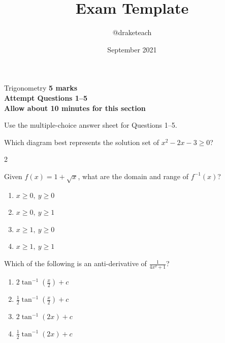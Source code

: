 \documentclass[12pt]{extarticle}    %
\title{Exam Template}       %
\author{@draketeach}        %
\date{September 2021}       %
\begin{document}

\begin{sectionheader}{Trigonometry}
    \textbf{5 marks\\
    Attempt Questions 1--5\\
    Allow about 10 minutes for this section}
    
    Use the multiple-choice answer sheet for Questions 1--5.
\end{sectionheader}

\begin{multiplechoice}              %

    \item Which diagram best represents the solution set of $x^2-2x-3\ge 0$?                %
    \begin{enumerate}               %
    \begin{multicols}{2}            %
        \item {}    %
        \item {}
        \item {}
        \item {}
    \end{multicols}
    \end{enumerate}

    \item Given $f(x)=1+\sqrt{x}$, what are the domain and range of $f^{-1}(x)$?    %
    \begin{enumerate}               %
        \item $x\ge 0,\ y\ge 0$     %
        \item $x\ge 0,\ y\ge 1$
        \item $x\ge 1,\ y\ge 0$
        \item $x\ge 1,\ y\ge 1$
    \end{enumerate}    

    \item Which of the following is an anti-derivative of $\displaystyle\frac{1}{4x^2+1}$?
    \begin{enumerate}          
        \item $\displaystyle2\tan^{-1}{\left(\frac{x}{2}\right)}+c$    
        \item $\displaystyle\frac{1}{2}\tan^{-1}{\left(\frac{x}{2}\right)}+c$
        \item $2\tan^{-1}{(2x)}+c$
        \item $\displaystyle\frac{1}{2}\tan^{-1}{(2x)}+c$
    \end{enumerate}    
    

\end{multiplechoice}
\end{document}
